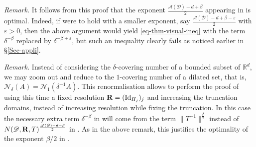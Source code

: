 \documentclass[a4paper,english]{amsart}
\theoremstyle{definition}
\newenvironment{remark}{\par\medskip \noindent \textit{Remark.} \rmfamily}{\medskip}
\newcommand{\R}{\mathbb{R}}
\newcommand{\eps}{\varepsilon}
\newcommand{\1}{\mathbbm{1}}
\newcommand{\bbR}{{\bf{R}}}
\newcommand{\cN} {{\mathcal N}}
\newcommand{\sD} {{\mathscr D}}
\newcommand{\sA}{\mathscr{A}}
\DeclareMathOperator{\Id}{Id}
\begin{document}
\begin{remark}
It follows from this proof that the exponent $\frac{\sA(\sD)-d+\beta}{2}$ appearing in  is optimal. Indeed, if  were to hold with a smaller exponent, say $\frac{\sA(\sD)-d+\beta- \eps}{2}$ with $\eps>0$, then the above argument would yield \eqref{eq-thm-visual-ineq} with the term $\delta^{-\beta}$ replaced by $\delta^{-\beta+\eps}$, but such an inequality clearly fails as noticed earlier in \S\ref{Sec-appli}.
\end{remark}

\begin{remark}
Instead of considering the $\delta$-covering number of a bounded subset of $\R^d$, we may zoom out and reduce to the $1$-covering number of a dilated set, that is, $\cN_{\delta}(A)=\cN_{1}(\delta^{-1}A)$.
This renormalisation allows to perform the proof of  using this time a fixed resolution $\bbR=(\Id_{H_{j}})_{j}$ and increasing the truncation domains, instead of increasing resolution while fixing the truncation. In this case the necessary extra term $\delta^{-\beta}$ in  will come from the term $\|T^{-1}\|^{\frac{\beta}{2}}$ instead of $N(\sD, \bbR, T)^{\frac{\sA(\sD)-d+\beta}{2}}$ in .
As in the above remark, this justifies the optimality of the exponent $\beta/2$ in .
\end{remark}

\appendix
\end{document}

